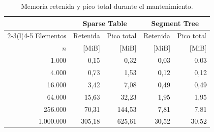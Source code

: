 \begin{table}[!ht]
    \centering
    \caption{Memoria retenida y pico total durante el mantenimiento.}
    \label{tab:res-memoria}
    \begin{tabular}{@{}rrrrr@{}}
        \toprule
        & \multicolumn{2}{c}{Sparse Table} & \multicolumn{2}{c}{Segment Tree} \\
        \cmidrule(lr){2-3}\cmidrule(l){4-5}
        Elementos & Retenida & Pico total & Retenida & Pico total \\
        \(n\) & [MiB] & [MiB] & [MiB] & [MiB] \\
        \midrule
        1.000 & 0{,}15 & 0{,}32 & 0{,}03 & 0{,}03 \\
        4.000 & 0{,}73 & 1{,}53 & 0{,}12 & 0{,}12 \\
        16.000 & 3{,}42 & 7{,}08 & 0{,}49 & 0{,}49 \\
        64.000 & 15{,}63 & 32{,}23 & 1{,}95 & 1{,}95 \\
        256.000 & 70{,}31 & 144{,}53 & 7{,}81 & 7{,}81 \\
        1.000.000 & 305{,}18 & 625{,}61 & 30{,}52 & 30{,}52 \\
        \bottomrule
    \end{tabular}
\end{table}

\endgroup
